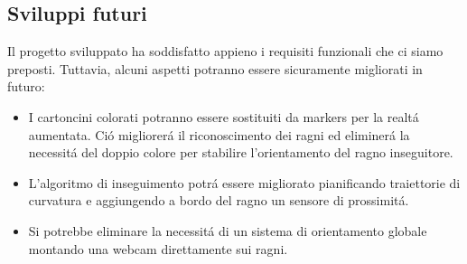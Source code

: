 \documentclass [11pt ,a4paper ,twoside ]{article}
\begin{document}
\subsection{Sviluppi futuri}
Il progetto sviluppato ha soddisfatto appieno i requisiti funzionali che ci siamo preposti. Tuttavia, alcuni aspetti potranno essere sicuramente migliorati in futuro:
\begin{itemize}
\item I cartoncini colorati potranno essere sostituiti da markers per la realt\'a aumentata. Ci\'o migliorer\'a il riconoscimento dei ragni ed eliminer\'a la necessit\'a del doppio colore per stabilire l'orientamento del ragno inseguitore. 
\item L'algoritmo di inseguimento potr\'a essere migliorato pianificando traiettorie di curvatura e aggiungendo a bordo del ragno un sensore di prossimit\'a.
\item Si potrebbe eliminare la necessit\'a di un sistema di orientamento globale montando una webcam direttamente sui ragni.
\end{itemize}
\end{document}
